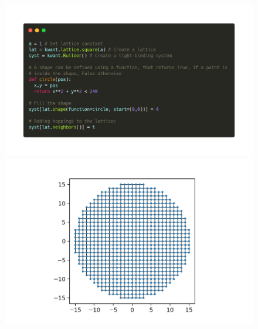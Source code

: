 \documentclass[12pt]{article}
\numberwithin{equation}{section}
\begin{document}
\newpage
\begin{figure}
  \centering
  \begin{minipage}{0.49\textwidth}
    \centering
    \includegraphics[width=1.0\textwidth]{./media/example-circle-code.png} %
\end{minipage}\hfill
  \begin{minipage}{0.49\textwidth}
      \centering
      \includegraphics[width=1.0\textwidth]{./media/example-circle.png} %
  \end{minipage}
\end{figure}
\end{document}
